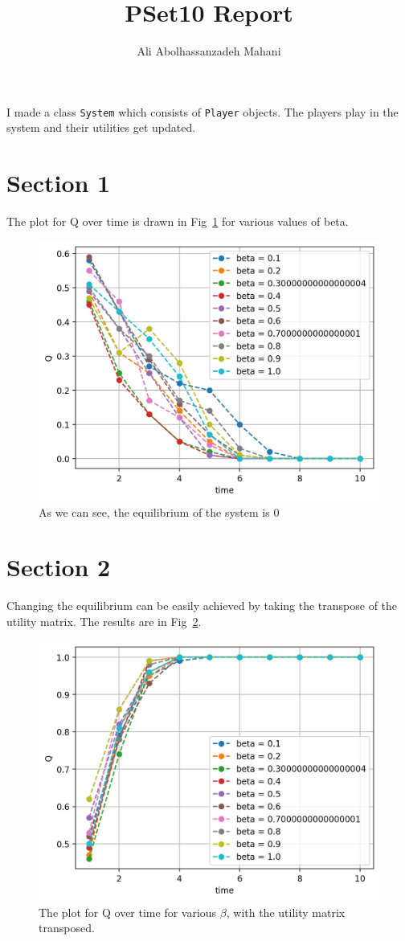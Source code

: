 \documentclass[12pt, a4paper]{article}
\title{PSet10 Report}
\author{Ali Abolhassanzadeh Mahani}
\begin{document}
	\maketitle
	I made a class \texttt{System} which consists of \texttt{Player} objects. The players play in the system and their utilities get updated.
	\section{Section 1}
	The plot for  Q over time is drawn in Fig~\ref{fig:Qs} for various values of beta.
	\begin{figure}[h!]
		\centering
		\includegraphics[width=.9\linewidth]{../results/Q_t_betas.jpg}
		\caption{As we can see, the equilibrium of the system is 0}
		\label{fig:Qs}
	\end{figure}
	
	\section{Section 2}
	Changing the equilibrium can be easily achieved by taking the transpose of the utility matrix. The results are in Fig~\ref{fig:Qs_inverse}.
	\begin{figure}[h!]
		\centering
		\includegraphics[width=.8\linewidth]{../results/Q_t_betas_inverted.jpg}
		\caption{The plot for Q over time for various $\beta$, with the utility matrix transposed.}
		\label{fig:Qs_inverse}
	\end{figure}
	
\end{document}
